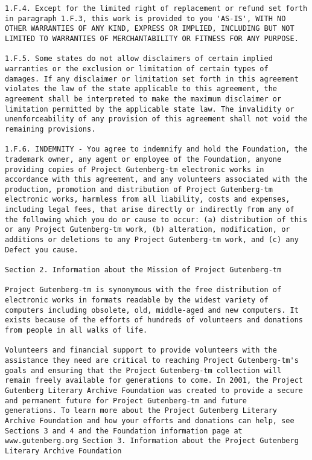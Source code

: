 \documentclass[oneside]{book}
\begin{document}
\begin{verbatim}
1.F.4. Except for the limited right of replacement or refund set forth
in paragraph 1.F.3, this work is provided to you 'AS-IS', WITH NO
OTHER WARRANTIES OF ANY KIND, EXPRESS OR IMPLIED, INCLUDING BUT NOT
LIMITED TO WARRANTIES OF MERCHANTABILITY OR FITNESS FOR ANY PURPOSE.

1.F.5. Some states do not allow disclaimers of certain implied
warranties or the exclusion or limitation of certain types of
damages. If any disclaimer or limitation set forth in this agreement
violates the law of the state applicable to this agreement, the
agreement shall be interpreted to make the maximum disclaimer or
limitation permitted by the applicable state law. The invalidity or
unenforceability of any provision of this agreement shall not void the
remaining provisions.

1.F.6. INDEMNITY - You agree to indemnify and hold the Foundation, the
trademark owner, any agent or employee of the Foundation, anyone
providing copies of Project Gutenberg-tm electronic works in
accordance with this agreement, and any volunteers associated with the
production, promotion and distribution of Project Gutenberg-tm
electronic works, harmless from all liability, costs and expenses,
including legal fees, that arise directly or indirectly from any of
the following which you do or cause to occur: (a) distribution of this
or any Project Gutenberg-tm work, (b) alteration, modification, or
additions or deletions to any Project Gutenberg-tm work, and (c) any
Defect you cause.

Section 2. Information about the Mission of Project Gutenberg-tm

Project Gutenberg-tm is synonymous with the free distribution of
electronic works in formats readable by the widest variety of
computers including obsolete, old, middle-aged and new computers. It
exists because of the efforts of hundreds of volunteers and donations
from people in all walks of life.

Volunteers and financial support to provide volunteers with the
assistance they need are critical to reaching Project Gutenberg-tm's
goals and ensuring that the Project Gutenberg-tm collection will
remain freely available for generations to come. In 2001, the Project
Gutenberg Literary Archive Foundation was created to provide a secure
and permanent future for Project Gutenberg-tm and future
generations. To learn more about the Project Gutenberg Literary
Archive Foundation and how your efforts and donations can help, see
Sections 3 and 4 and the Foundation information page at
www.gutenberg.org Section 3. Information about the Project Gutenberg
Literary Archive Foundation


\end{verbatim}
\end{document}
